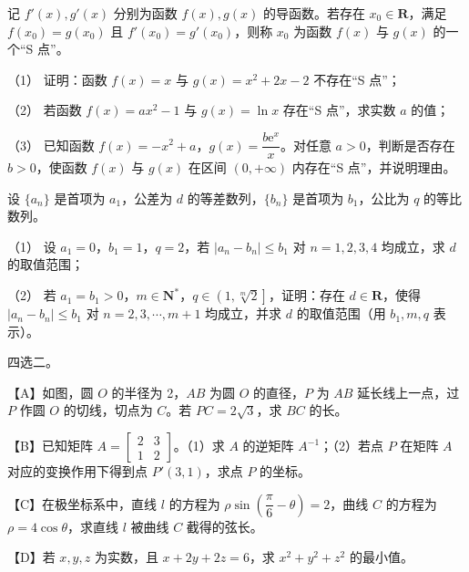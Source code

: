 \begin{question}
记 $f'(x), g'(x)$ 分别为函数 $f(x), g(x)$ 的导函数。若存在 $x_0 \in \mathbf{R}$，满足 $f(x_0) = g(x_0)$ 且 $f'(x_0) = g'(x_0)$，则称 $x_0$ 为函数 $f(x)$ 与 $g(x)$ 的一个“S 点”。

（1） 证明：函数 $f(x) = x$ 与 $g(x) = x^2 + 2x - 2$ 不存在“S 点”；

（2） 若函数 $f(x) = ax^2 - 1$ 与 $g(x) = \ln x$ 存在“S 点”，求实数 $a$ 的值；

（3） 已知函数 $f(x) = -x^2 + a$，$g(x) = \dfrac{b\mathrm{e}^x}{x}$。对任意 $a > 0$，判断是否存在 $b > 0$，使函数 $f(x)$ 与 $g(x)$ 在区间 $(0, +\infty)$ 内存在“S 点”，并说明理由。

\end{question}
\begin{question}
设 $\{a_n\}$ 是首项为 $a_1$，公差为 $d$ 的等差数列，$\{b_n\}$ 是首项为 $b_1$，公比为 $q$ 的等比数列。

（1） 设 $a_1 = 0$，$b_1 = 1$，$q = 2$，若 $|a_n - b_n| \leqslant b_1$ 对 $n = 1, 2, 3, 4$ 均成立，求 $d$ 的取值范围；

（2） 若 $a_1 = b_1 > 0$，$m \in \mathbf{N}^*$，$q \in \left(1, \sqrt[m]{2}\right]$，证明：存在 $d \in \mathbf{R}$，使得 $|a_n - b_n| \leqslant b_1$ 对 $n = 2, 3, \cdots, m + 1$ 均成立，并求 $d$ 的取值范围（用 $b_1, m, q$ 表示）。

\Needspace{0.4\textheight}
\end{question}
\begin{question}
四选二。

【A】如图，圆 $O$ 的半径为 2，$AB$ 为圆 $O$ 的直径，$P$ 为 $AB$ 延长线上一点，过 $P$ 作圆 $O$ 的切线，切点为 $C$。若 $PC = 2\sqrt{3}$，求 $BC$ 的长。
\nopagebreak[4]
\begin{center}\end{center}
\nopagebreak[4]
【B】已知矩阵 $A = \begin{bmatrix} 2 & 3 \\ 1 & 2 \end{bmatrix}$。（1）求 $A$ 的逆矩阵 $A^{-1}$；（2）若点 $P$ 在矩阵 $A$ 对应的变换作用下得到点 $P'(3, 1)$，求点 $P$ 的坐标。

【C】在极坐标系中，直线 $l$ 的方程为 $\rho \sin\left(\dfrac{\pi}{6} - \theta\right) = 2$，曲线 $C$ 的方程为 $\rho = 4\cos\theta$，求直线 $l$ 被曲线 $C$ 截得的弦长。

【D】若 $x, y, z$ 为实数，且 $x + 2y + 2z = 6$，求 $x^2 + y^2 + z^2$ 的最小值。

\Needspace{0.4\textheight}
\end{question}
